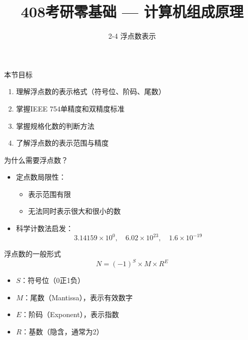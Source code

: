 \documentclass[10pt, aspectratio=169]{beamer}
\title{408考研零基础 --- 计算机组成原理}
\subtitle{2-4 浮点数表示}
\author{}
\date{}
\begin{document}
\begin{frame}{本节目标}
    \begin{enumerate}
        \item 理解浮点数的表示格式（符号位、阶码、尾数）
        \item 掌握IEEE 754单精度和双精度标准
        \item 掌握规格化数的判断方法
        \item 了解浮点数的表示范围与精度
    \end{enumerate}
\end{frame}

\begin{frame}{为什么需要浮点数？}
    \begin{itemize}
        \item 定点数局限性：
        \begin{itemize}
            \item 表示范围有限
            \item 无法同时表示很大和很小的数
        \end{itemize}
        \item 科学计数法启发：
        \[
            3.14159 \times 10^0,\quad 6.02 \times 10^{23}, \quad 1.6 \times 10^{-19}
        \]
        \end{itemize}
    \vspace{0.5em}
    \begin{block}{浮点数的一般形式}
        \[
            N = (-1)^S \times M \times R^E
        \]
        \begin{itemize}
            \item $S$：符号位（0正1负）
            \item $M$：尾数（Mantissa），表示有效数字
            \item $E$：阶码（Exponent），表示指数
            \item $R$：基数（隐含，通常为2）
        \end{itemize}
    \end{block}
\end{frame}
\end{document}
